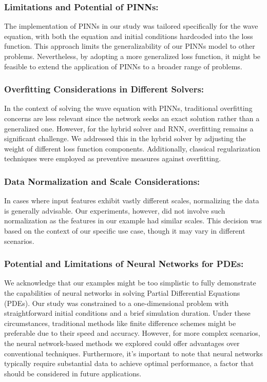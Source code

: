\documentclass[twoside,11pt]{report}
\begin{document}
    \subsubsection{Limitations and Potential of PINNs:}
    The implementation of PINNs in our study was tailored specifically for the wave equation, with both the 
    equation and initial conditions hardcoded into the loss function. This approach limits the generalizability 
    of our PINNs model to other problems. Nevertheless, by adopting a more generalized loss function, it might 
    be feasible to extend the application of PINNs to a broader range of problems.


    \subsubsection{Overfitting Considerations in Different Solvers:}
    In the context of solving the wave equation with PINNs, traditional overfitting concerns are less relevant 
    since the network seeks an exact solution rather than a generalized one. However, for the hybrid solver and RNN, 
    overfitting remains a significant challenge. We addressed this in the hybrid solver by adjusting the weight of 
    different loss function components. Additionally, classical regularization techniques were employed as 
    preventive measures against overfitting.

    \subsubsection{Data Normalization and Scale Considerations:}
    In cases where input features exhibit vastly different scales, normalizing the data is generally advisable. 
    Our experiments, however, did not involve such normalization as the features in our example had similar scales. 
    This decision was based on the context of our specific use case, though it may vary in different scenarios.

    \subsubsection{Potential and Limitations of Neural Networks for PDEs:}
    We acknowledge that our examples might be too simplistic to fully demonstrate the capabilities of neural 
    networks in solving Partial Differential Equations (PDEs). Our study was constrained to a one-dimensional 
    problem with straightforward initial conditions and a brief simulation duration. Under these circumstances, 
    traditional methods like finite difference schemes might be preferable due to their speed and accuracy. However, 
    for more complex scenarios, the neural network-based methods we explored could offer advantages over 
    conventional techniques. Furthermore, it's important to note that neural networks typically require 
    substantial data to achieve optimal performance, a factor that should be considered in future applications.
\end{document}
